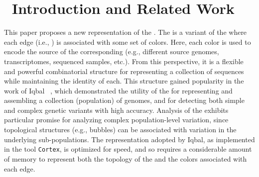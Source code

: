 %
%
%
%

\section{~Introduction and Related Work}

This paper proposes a new representation of the \cdbg. The \cdbg is a variant of
the \dbg where each edge (i.e., \kmer) is associated with some set of colors.
Here, each color is used to encode the source of the corresponding \kmers (e.g.,
different source genomes, transcriptomes, sequenced samples, etc.). From this
perspective, it is a flexible and powerful combinatorial structure for
representing a collection of sequences while maintaining the identity of each.
This structure gained popularity in the work of Iqbal
\etal~\cite{Iqbal2012Novo}, which demonstrated the utility of the \cdbg for
representing and assembling a collection (population) of genomes, and for
detecting both simple and complex genetic variants with high accuracy. Analysis
of the \cdbg exhibits particular promise for analyzing complex population-level
variation, since topological structures (e.g., bubbles) can be associated with
variation in the underlying sub-populations. The representation adopted by
Iqbal, as implemented in the tool \texttt{Cortex}, is optimized for speed, and
so requires a considerable amount of memory to represent both the topology of
the \dbg and the colors associated with each edge.

